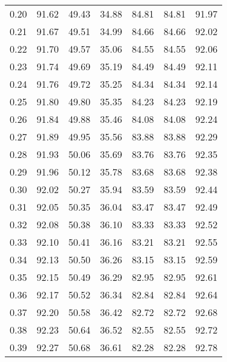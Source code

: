 \begin{tabular}{|c|c|c|c|c|c|c|}
      0.20 &     91.62 &     49.43 &      34.88 &   84.81 &      84.81 &         91.97 \\
      0.21 &     91.67 &     49.51 &      34.99 &   84.66 &      84.66 &         92.02 \\
      0.22 &     91.70 &     49.57 &      35.06 &   84.55 &      84.55 &         92.06 \\
      0.23 &     91.74 &     49.69 &      35.19 &   84.49 &      84.49 &         92.11 \\
      0.24 &     91.76 &     49.72 &      35.25 &   84.34 &      84.34 &         92.14 \\
      0.25 &     91.80 &     49.80 &      35.35 &   84.23 &      84.23 &         92.19 \\
      0.26 &     91.84 &     49.88 &      35.46 &   84.08 &      84.08 &         92.24 \\
      0.27 &     91.89 &     49.95 &      35.56 &   83.88 &      83.88 &         92.29 \\
      0.28 &     91.93 &     50.06 &      35.69 &   83.76 &      83.76 &         92.35 \\
      0.29 &     91.96 &     50.12 &      35.78 &   83.68 &      83.68 &         92.38 \\
      0.30 &     92.02 &     50.27 &      35.94 &   83.59 &      83.59 &         92.44 \\
      0.31 &     92.05 &     50.35 &      36.04 &   83.47 &      83.47 &         92.49 \\
      0.32 &     92.08 &     50.38 &      36.10 &   83.33 &      83.33 &         92.52 \\
      0.33 &     92.10 &     50.41 &      36.16 &   83.21 &      83.21 &         92.55 \\
      0.34 &     92.13 &     50.50 &      36.26 &   83.15 &      83.15 &         92.59 \\
      0.35 &     92.15 &     50.49 &      36.29 &   82.95 &      82.95 &         92.61 \\
      0.36 &     92.17 &     50.52 &      36.34 &   82.84 &      82.84 &         92.64 \\
      0.37 &     92.20 &     50.58 &      36.42 &   82.72 &      82.72 &         92.68 \\
      0.38 &     92.23 &     50.64 &      36.52 &   82.55 &      82.55 &         92.72 \\
      0.39 &     92.27 &     50.68 &      36.61 &   82.28 &      82.28 &         92.78 \\

\end{tabular}
